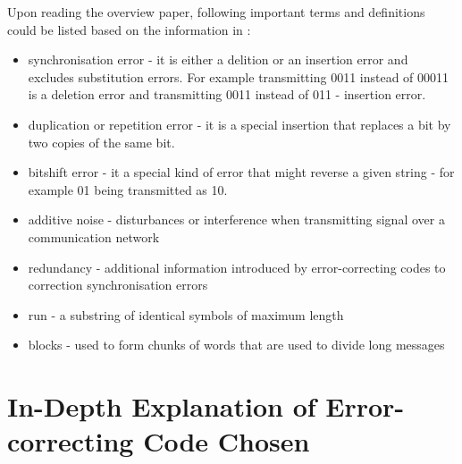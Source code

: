 \documentclass[12pt]%
{article}
\begin{document}
Upon reading the overview paper, following important terms and definitions could be listed based on the information in \cite{mercier2010survey}:
\begin{itemize}
\item synchronisation error - it is either a delition or an insertion error and excludes substitution errors. For example transmitting 0011 instead of 00011 is a deletion error and transmitting 0011 instead of 011 - insertion error.
\item duplication or repetition error - it is a special insertion that replaces a bit by two copies of the same bit.
\item bitshift error - it a special kind of error that might reverse a given string - for example 01 being transmitted as 10.
\item additive noise - disturbances or interference when transmitting signal over a communication network
\item redundancy - additional information introduced by error-correcting codes to correction synchronisation errors
\item run - a substring of identical symbols of maximum length
\item blocks - used to form chunks of words that are used to divide long messages
\end{itemize}

\section{In-Depth Explanation of Error-correcting Code Chosen}
\end{document}
